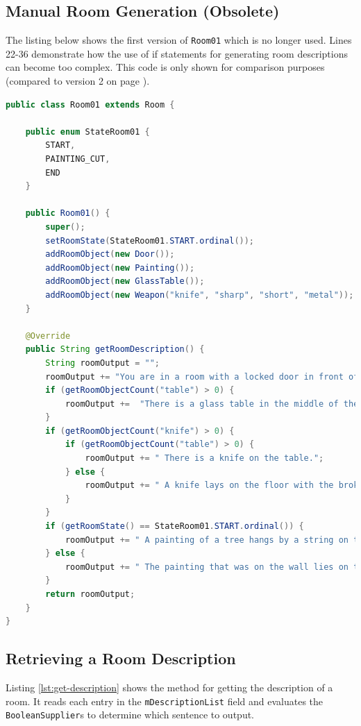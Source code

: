 \documentclass[11pt]{article}
\begin{document}
\subsection{Manual Room Generation (Obsolete)}
\label{appendix:room-gen-v1}

The listing below shows the first version of \texttt{Room01} which is no longer used. Lines 22-36 demonstrate how the use of if statements for generating room descriptions can become too complex. This code is only shown for comparison purposes (compared to version 2 on page \pageref{lst:room01}).

\begin{lstlisting}[language=Java, caption=Room01.java (Version 1)]
public class Room01 extends Room {

    public enum StateRoom01 {
        START,
        PAINTING_CUT,
        END
    }

    public Room01() {
        super();
        setRoomState(StateRoom01.START.ordinal());
        addRoomObject(new Door());
        addRoomObject(new Painting());
        addRoomObject(new GlassTable());
        addRoomObject(new Weapon("knife", "sharp", "short", "metal"));
    }

    @Override
    public String getRoomDescription() {
        String roomOutput = "";
        roomOutput += "You are in a room with a locked door in front of you.";
        if (getRoomObjectCount("table") > 0) {
            roomOutput +=  "There is a glass table in the middle of the room.";
        }
        if (getRoomObjectCount("knife") > 0) {
            if (getRoomObjectCount("table") > 0) {
                roomOutput += " There is a knife on the table.";
            } else {
                roomOutput += " A knife lays on the floor with the broken table.";
            }
        }
        if (getRoomState() == StateRoom01.START.ordinal()) {
            roomOutput += " A painting of a tree hangs by a string on the wall to your left.";
        } else {
            roomOutput += " The painting that was on the wall lies on the floor.";
        }
        return roomOutput;
    }
}
\end{lstlisting}

\newpage
\subsection{Retrieving a Room Description}
\label{appendix:get-description}

Listing \ref{lst:get-description} shows the method for getting the description of a room. It reads each entry in the \texttt{mDescriptionList} field and evaluates the \texttt{BooleanSupplier}s to determine which sentence to output.
\end{document}
